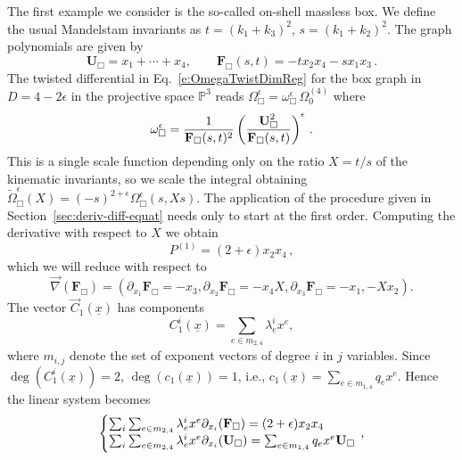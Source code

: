 \documentclass[a4paper,12pt]{article}
\numberwithin{equation}{section}
\numberwithin{figure}{section}
\begin{document}
The first example we consider is the so-called on-shell massless box. We define the usual Mandelstam invariants as $t=(k_1+k_3)^2$, $s=(k_1+k_2)^2$.  The graph polynomials are given by
\begin{equation}
	\label{e:Boxgraphpolynomials}
	\textbf{U}_{\Box}=x_1+\cdots +x_4,\qquad
	\textbf{F}_{\Box}(s,t)=-t x_2x_4-sx_1x_3 \, .
\end{equation}
The twisted differential in Eq.~\eqref{e:OmegaTwistDimReg} for the box
graph in $D=4-2\epsilon$ in the projective
space $\mathbb P^3$ reads $\Omega_\Box^\epsilon= \omega_\Box^\epsilon
\,\Omega_0^{(4)}$ where
\begin{equation}\label{e:OmegaBox}
	\omega_\Box^\epsilon=   {1\over \textbf{F}_{\Box}(s,t)^2
	}\left(\textbf{U}_{\Box}^2\over \textbf{F}_{\Box}(s,t)\right)^\epsilon \, .
\end{equation}
This is a single scale function depending only on the ratio
$X=t/s$ of the kinematic invariants, so we scale the integral obtaining
$\tilde \Omega_\Box^\epsilon(X)=(-s)^{2+\epsilon} \Omega_\Box^\epsilon(s,X s)$.
%
The application of the procedure given in
Section~\ref{sec:deriv-diff-equat} needs only to start at the first
order. Computing the derivative with respect to $X$ we obtain 
%
\begin{equation}
P  ^{(1)}= (2+\epsilon) x_2 x_4 \, , 
\end{equation}
which we will reduce with respect to
\begin{equation}\vec\nabla(\mathbf F_\Box)=\left(
    \partial_{x_1}\textbf{F}_\Box=-x_3, \partial_{x_2}\textbf{F}_\Box=
    -x_4 X, \partial_{x_3}\textbf{F}_\Box=-x_1, -X x_2  \right).
\end{equation}
The  vector  $\vec C_{1}(\underline x)$ has components 
\begin{equation}
C^i_{1}(\underline x)= \sum_{e \in m_{2,4}} \lambda^i_e x^e,	
\end{equation}
where $m_{i,j}$ denote the set of exponent vectors of degree $i$ in $j$ variables. Since $\deg(C^i_{1}(\underline x))=2$, $\deg (c_1(\underline x))=1$, i.e., $c_1(\underline x)=\sum_{e\in m_{1,4}} q_e x^e$. Hence the linear system becomes
%
\begin{equation}\label{e:sysCFU-Box}
	\left\{\begin{array}{@{}l@{}}
\sum_i \sum_{e \in m_{2,4}} \lambda^i_e x^e \partial_{x_i}(\mathbf F_\Box) 
		=    (2+\epsilon) x_2 x_4\\
\sum_i\sum_{e \in m_{2,4}} \lambda^i_e x^e \partial_{x_i}(\mathbf U_\Box) = \sum_{e\in m_{1,4}} q_e x^e \textbf{U}_\Box 
	\end{array}\right.\,,
\end{equation}
\end{document}
